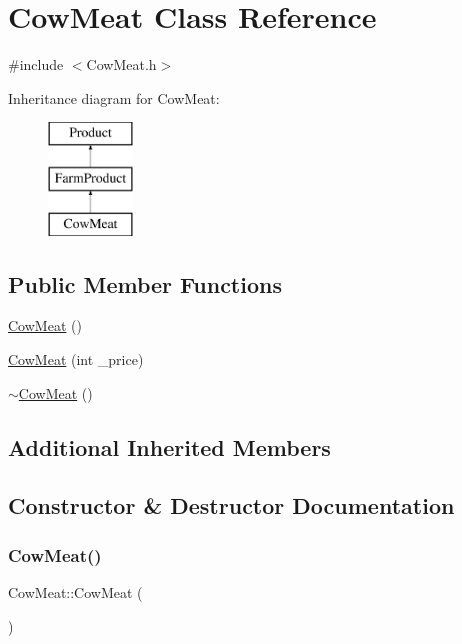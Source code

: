 \hypertarget{classCowMeat}{}\section{Cow\+Meat Class Reference}
\label{classCowMeat}


{\ttfamily \#include $<$Cow\+Meat.\+h$>$}

Inheritance diagram for Cow\+Meat\+:\begin{figure}[H]
\begin{center}
\leavevmode
\includegraphics[height=3.000000cm]{classCowMeat}
\end{center}
\end{figure}
\subsection*{Public Member Functions}
\begin{DoxyCompactItemize}
\item 
\mbox{\hyperlink{classCowMeat_a1904f2d6ad998a3a56ab0cf77c51eb35}{Cow\+Meat}} ()
\item 
\mbox{\hyperlink{classCowMeat_a290a564c35f51f63d461f5c8a5253419}{Cow\+Meat}} (int \+\_\+price)
\item 
\mbox{\hyperlink{classCowMeat_a4d2904e1fe04f3f5d91d484f512b4716}{$\sim$\+Cow\+Meat}} ()
\end{DoxyCompactItemize}
\subsection*{Additional Inherited Members}


\subsection{Constructor \& Destructor Documentation}
\mbox{\label{classCowMeat_a1904f2d6ad998a3a56ab0cf77c51eb35}} 
\subsubsection{\texorpdfstring{CowMeat()}{CowMeat()}\hspace{0.1cm}{\footnotesize\ttfamily [1/2]}}
{\footnotesize\ttfamily Cow\+Meat\+::\+Cow\+Meat (\begin{DoxyParamCaption}{ }\end{DoxyParamCaption})}

